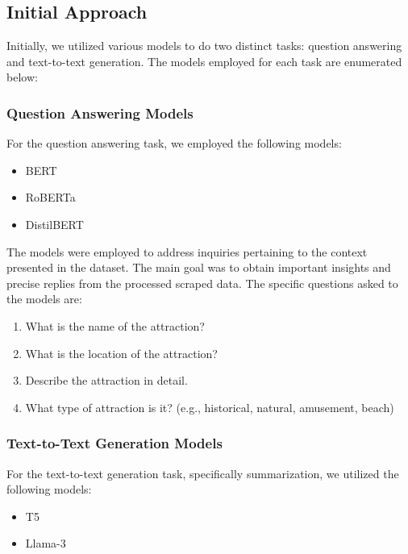 \documentclass[conference]{IEEEtran}
\begin{document}
    \subsection{Initial Approach}

        Initially, we utilized various models to do two distinct tasks: question answering and text-to-text generation. The models employed for each task are enumerated below:

        \subsubsection{Question Answering Models}
            For the question answering task, we employed the following models:
            \begin{itemize}
                \item BERT
                \item RoBERTa
                \item DistilBERT
            \end{itemize}

            The models were employed to address inquiries pertaining to the context presented in the dataset. The main goal was to obtain important insights and precise replies from the processed scraped data. The specific questions asked to the models are:

            \begin{mdframed}[linewidth=1pt, innerleftmargin=15pt, innerrightmargin=15pt, innertopmargin=15pt, innerbottommargin=15pt]
                \begin{enumerate}
                    \item What is the name of the attraction?
                    \item What is the location of the attraction?
                    \item Describe the attraction in detail.
                    \item What type of attraction is it? (e.g., historical, natural, amusement, beach)
                \end{enumerate}
            \end{mdframed}

        \subsubsection{Text-to-Text Generation Models}
            For the text-to-text generation task, specifically summarization, we utilized the following models:
            \begin{itemize}
                \item T5
                \item Llama-3
            \end{itemize}
\end{document}
